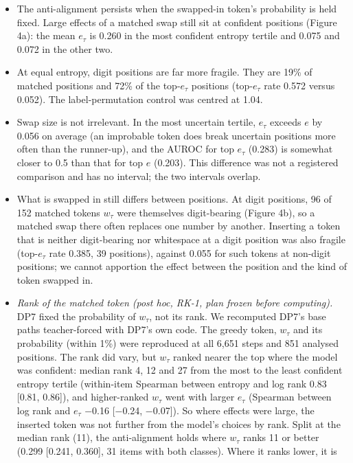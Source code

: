 \documentclass[
  10pt,
  a4paper,
]{article}
\providecommand{\tightlist}{%
  \setlength{\itemsep}{0pt}\setlength{\parskip}{0pt}}
\begin{document}
\begin{itemize}
\tightlist
\item
  The anti-alignment persists when the swapped-in token's probability is held fixed. Large effects of a matched swap still sit at confident positions (Figure 4a): the mean \(e_{\tau}\) is 0.260 in the
  most confident entropy tertile and 0.075 and 0.072 in the other two.
\item
  At equal entropy, digit positions are far more fragile. They are 19\% of matched positions and 72\% of the top-\(e_{\tau}\) positions (top-\(e_{\tau}\) rate 0.572 versus 0.052). The
  label-permutation control was centred at 1.04.
\item
  Swap size is not irrelevant. In the most uncertain tertile, \(e_{\tau}\) exceeds \(e\) by 0.056 on average (an improbable token does break uncertain positions more often than the runner-up), and the
  AUROC for top \(e_{\tau}\) (0.283) is somewhat closer to 0.5 than that for top \(e\) (0.203). This difference was not a registered comparison and has no interval; the two intervals overlap.
\item
  What is swapped in still differs between positions. At digit positions, 96 of 152 matched tokens \(w_{\tau}\) were themselves digit-bearing (Figure 4b), so a matched swap there often replaces one
  number by another. Inserting a token that is neither digit-bearing nor whitespace at a digit position was also fragile (top-\(e_{\tau}\) rate 0.385, 39 positions), against 0.055 for such tokens at
  non-digit positions; we cannot apportion the effect between the position and the kind of token swapped in.
\item
  \emph{Rank of the matched token (post hoc, RK-1, plan frozen before computing).} DP7 fixed the probability of \(w_{\tau}\), not its rank. We recomputed DP7's base paths teacher-forced with DP7's own
  code. The greedy token, \(w_{\tau}\) and its probability (within 1\%) were reproduced at all 6,651 steps and 851 analysed positions. The rank did vary, but \(w_{\tau}\) ranked nearer the top where
  the model was confident: median rank 4, 12 and 27 from the most to the least confident entropy tertile (within-item Spearman between entropy and log rank 0.83 {[}0.81, 0.86{]}), and higher-ranked
  \(w_{\tau}\) went with larger \(e_{\tau}\) (Spearman between log rank and \(e_{\tau}\) −0.16 {[}−0.24, −0.07{]}). So where effects were large, the inserted token was not further from the model's
  choices by rank. Split at the median rank (11), the anti-alignment holds where \(w_{\tau}\) ranks 11 or better (0.299 {[}0.241, 0.360{]}, 31 items with both classes). Where it ranks lower, it is

\end{itemize}
\end{document}
